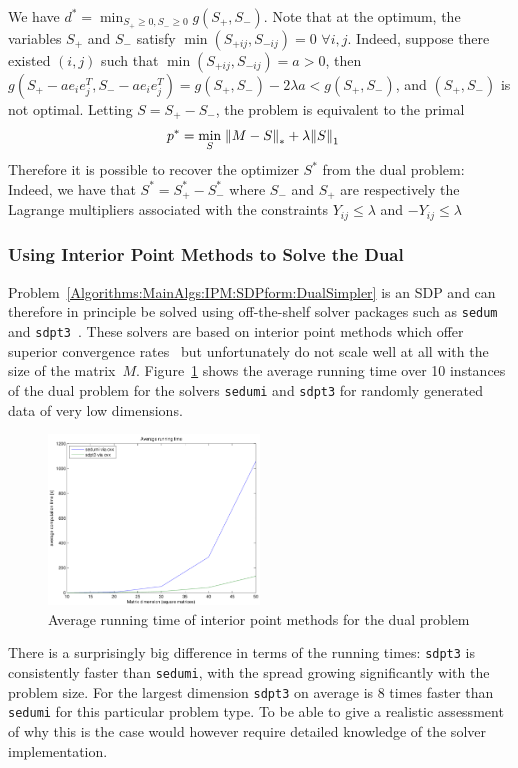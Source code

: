 We have $d^* = \min_{S_+\geq 0, S_-\geq 0} g(S_+, S_-)$. Note that at the optimum, the variables $S_+$ and $S_-$ satisfy $\min (S_{+ij}, S_{-ij}) = 0$ $\forall i,j$. Indeed, suppose there existed $(i,j)$ such that $\min(S_{+ij}, S_{-ij}) = a > 0$, then $g(S_+ - ae_ie_j^T, S_- - ae_ie_j^T) = g(S_+, S_-) - 2\lambda a < g(S_+, S_-)$, and $(S_+, S_-)$ is not optimal. Letting $S = S_+ - S_-$, the problem is equivalent to the primal~
\begin{align*}
p^* = \min_{S} \; &{\left\|M-S\right\|}_{*}^{} + \lambda {\left\|S\right\|}_{1}^{} 
\end{align*}
Therefore it is possible to recover the optimizer $S^*$ from the dual problem: Indeed, we have that $S^* = S_+^* - S_-^*$ where $S_-$ and $S_+$ are respectively the Lagrange multipliers associated with the constraints $Y_{ij} \leq \lambda$ and $-Y_{ij} \leq \lambda$



\subsubsection{Using Interior Point Methods to Solve the Dual}
\label{Algorithms:MainAlgs:IPM:Complexity:Subsubsec}

Problem~\eqref{Algorithms:MainAlgs:IPM:SDPform:DualSimpler} is an SDP and can therefore in principle be solved using off-the-shelf solver packages such as \texttt{sedum}~\cite{Sturm:1999uq} and \texttt{sdpt3}~\cite{Toh:1999kx}. These solvers are based on interior point methods which offer superior convergence rates~\cite{Boyd:2004aa} but unfortunately do not scale well at all with the size of the matrix~$M$. Figure~\ref{Algorithms:MainAlgs:IPM:Complexity:figure} shows the average running time over 10 instances of the dual problem for the solvers \texttt{sedumi} and \texttt{sdpt3} for randomly generated data of very low dimensions. 
%
\begin{figure}[htbp]
\centering
\includegraphics[width=0.5\textwidth]{../figures/intpt_comparison}
\caption{Average running time of interior point methods for the dual problem}
\label{Algorithms:MainAlgs:IPM:Complexity:figure}
\end{figure}
%
There is a surprisingly big difference in terms of the running times: \texttt{sdpt3} is consistently faster than \texttt{sedumi}, with the spread growing significantly with the problem size. For the largest dimension \texttt{sdpt3} on average is 8 times faster than \texttt{sedumi} for this particular problem type. To be able to give a realistic assessment of why this is the case would however require detailed knowledge of the solver implementation. 

